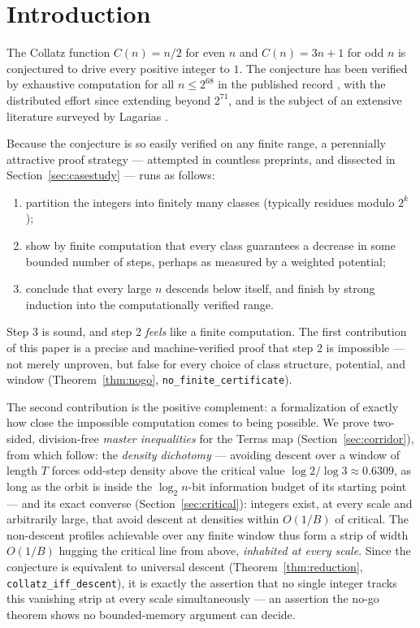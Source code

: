 \documentclass[11pt]{article}
\newcommand{\code}[1]{\texttt{#1}}
\begin{document}
\section{Introduction}

The Collatz function $C(n) = n/2$ for even $n$ and $C(n) = 3n+1$ for
odd $n$ is conjectured to drive every positive integer to $1$. The
conjecture has been verified by exhaustive computation for all
$n \le 2^{68}$ in the published record \cite{barina}, with the
distributed effort since extending beyond $2^{71}$, and is the subject
of an extensive literature surveyed by Lagarias \cite{lagarias-survey,
lagarias-book}.

Because the conjecture is so easily verified on any finite range, a
perennially attractive proof strategy --- attempted in countless
preprints, and dissected in Section~\ref{sec:casestudy} --- runs as
follows:
\begin{enumerate}
\item partition the integers into finitely many classes (typically
  residues modulo $2^k$);
\item show by finite computation that every class guarantees a decrease
  in some bounded number of steps, perhaps as measured by a weighted
  potential;
\item conclude that every large $n$ descends below itself, and finish by
  strong induction into the computationally verified range.
\end{enumerate}
Step 3 is sound, and step 2 \emph{feels} like a finite computation. The
first contribution of this paper is a precise and machine-verified
proof that step 2 is impossible --- not merely unproven, but false for
every choice of class structure, potential, and window
(Theorem~\ref{thm:nogo}, \code{no\_finite\_certificate}).

The second contribution is the positive complement: a formalization of
exactly how close the impossible computation comes to being possible.
We prove two-sided, division-free \emph{master inequalities} for the
Terras map (Section~\ref{sec:corridor}), from which follow: the
\emph{density dichotomy} --- avoiding descent over a window of length
$T$ forces odd-step density above the critical value
$\log 2/\log 3 \approx 0.6309$, as long as the orbit is inside the
$\log_2 n$-bit information budget of its starting point --- and its
exact converse (Section~\ref{sec:critical}): integers exist, at every
scale and arbitrarily large, that avoid descent at densities within
$O(1/B)$ of critical. The non-descent profiles achievable over any
finite window thus form a strip of width $O(1/B)$ hugging the critical
line from above, \emph{inhabited at every scale}. Since the conjecture
is equivalent to universal descent
(Theorem~\ref{thm:reduction}, \code{collatz\_iff\_descent}), it is
exactly the assertion that no single integer tracks this vanishing
strip at every scale simultaneously --- an assertion the no-go theorem
shows no bounded-memory argument can decide.
\end{document}
